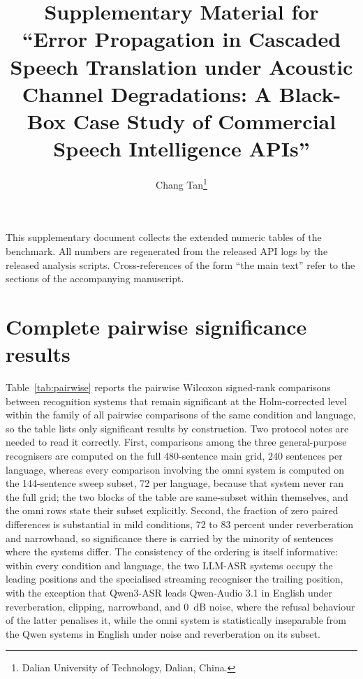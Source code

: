 \documentclass[11pt]{article}
\title{Supplementary Material for\\
``Error Propagation in Cascaded Speech Translation under Acoustic Channel
Degradations: A Black-Box Case Study of Commercial Speech Intelligence APIs''}
\author{Chang Tan\thanks{Dalian University of Technology, Dalian, China.}}
\date{}
\begin{document}
\maketitle

This supplementary document collects the extended numeric tables of the
benchmark. All numbers are regenerated from the released API logs by the
released analysis scripts. Cross-references of the form ``the main text''
refer to the sections of the accompanying manuscript.

\section{Complete pairwise significance results}
\label{supp:significance}

Table~\ref{tab:pairwise} reports the pairwise Wilcoxon signed-rank
comparisons between recognition systems that remain significant at the
Holm-corrected level within the family of all pairwise comparisons of the
same condition and language, so the table lists only significant results
by construction. Two protocol notes are needed to read it correctly.
First, comparisons among the three general-purpose recognisers are computed
on the full 480-sentence main grid, 240 sentences per language, whereas
every comparison involving the omni system is computed on the 144-sentence
sweep subset, 72 per language, because that system never ran the full grid;
the two blocks of the table are same-subset within themselves, and the
omni rows state their subset explicitly. Second, the fraction of zero
paired differences is substantial in mild conditions, 72 to 83 percent
under reverberation and narrowband, so significance there is carried by
the minority of sentences where the systems differ. The consistency of the
ordering is itself informative: within every condition and language,
the two LLM-ASR systems occupy the leading positions and the specialised
streaming recogniser the trailing position, with the exception that
Qwen3-ASR leads Qwen-Audio 3.1 in English under reverberation, clipping,
narrowband, and 0~dB noise, where the refusal behaviour of the latter
penalises it, while the omni system is statistically inseparable from the
Qwen systems in English under noise and reverberation on its subset.
\end{document}
